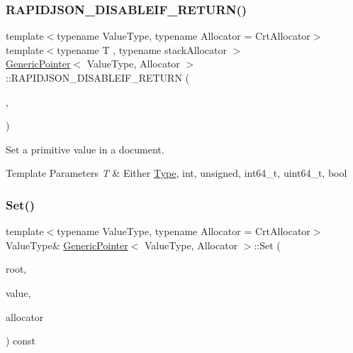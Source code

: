 \subsubsection{\texorpdfstring{R\+A\+P\+I\+D\+J\+S\+O\+N\+\_\+\+D\+I\+S\+A\+B\+L\+E\+I\+F\+\_\+\+R\+E\+T\+U\+R\+N()}{RAPIDJSON\_DISABLEIF\_RETURN()}\hspace{0.1cm}{\footnotesize\ttfamily [3/3]}}
{\footnotesize\ttfamily template$<$typename Value\+Type, typename Allocator = Crt\+Allocator$>$ \\
template$<$typename T , typename stack\+Allocator $>$ \\
\hyperlink{class_generic_pointer}{Generic\+Pointer}$<$ Value\+Type, Allocator $>$\+::R\+A\+P\+I\+D\+J\+S\+O\+N\+\_\+\+D\+I\+S\+A\+B\+L\+E\+I\+F\+\_\+\+R\+E\+T\+U\+RN (\begin{DoxyParamCaption}\item[{(internal\+::\+Or\+Expr$<$ internal\+::\+Is\+Pointer$<$ T $>$, \hyperlink{structinternal_1_1_is_generic_value}{internal\+::\+Is\+Generic\+Value}$<$ T $>$ $>$)}]{,  }\item[{(Value\+Type \&)}]{ }\end{DoxyParamCaption})}



Set a primitive value in a document. 


\begin{DoxyTemplParams}{Template Parameters}
{\em T} & Either \hyperlink{rapidjson_8h_a1d1cfd8ffb84e947f82999c682b666a7}{Type}, {\ttfamily int}, {\ttfamily unsigned}, {\ttfamily int64\+\_\+t}, {\ttfamily uint64\+\_\+t}, {\ttfamily bool} \\
\hline
\end{DoxyTemplParams}
\mbox{\label{class_generic_pointer_a71476d125a276b62a246990da1bd3468}} 
\subsubsection{\texorpdfstring{Set()}{Set()}}
{\footnotesize\ttfamily template$<$typename Value\+Type, typename Allocator = Crt\+Allocator$>$ \\
Value\+Type\& \hyperlink{class_generic_pointer}{Generic\+Pointer}$<$ Value\+Type, Allocator $>$\+::Set (\begin{DoxyParamCaption}\item[{Value\+Type \&}]{root,  }\item[{Value\+Type \&}]{value,  }\item[{typename Value\+Type\+::\+Allocator\+Type \&}]{allocator }\end{DoxyParamCaption}) const\hspace{0.3cm}{\ttfamily [inline]}}



